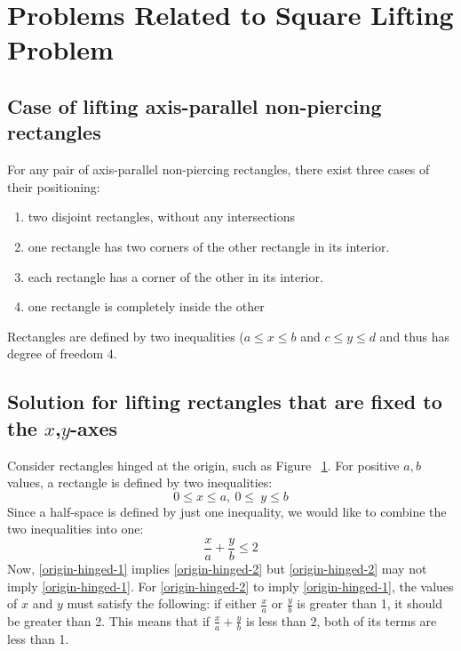 \documentclass{NSF}
\begin{document}
\section{Problems Related to Square Lifting Problem}

\subsection{Case of lifting axis-parallel non-piercing rectangles}
For any pair of axis-parallel non-piercing rectangles, there exist three cases of their positioning:
\begin{enumerate}
\item two disjoint rectangles, without any intersections
\item one rectangle has two corners of the other rectangle in its interior.
\item each rectangle has a corner of the other in its interior.
\item one rectangle is completely inside the other
\end{enumerate}
Rectangles are defined by two inequalities ($a\leq x \leq b$ and $c \leq y \leq d$ and thus has degree of freedom 4.

\begin{figure}[ht]
\hspace{.3in}
\caption{}
\label{fig:origin-building-example}
\end{figure}

\subsection{Solution for lifting rectangles that are fixed to the $x$,$y$-axes}

Consider rectangles hinged at the origin, such as Figure ~\ref{fig:origin-building-example}. For positive $a,b$ values, a rectangle is defined by two inequalities: 
\begin{equation}\label{origin-hinged-1}
0 \leq x \leq a,\  0\leq \  y \leq b
\end{equation}
Since a half-space is defined by just one inequality, we would like to combine the two inequalities into one: 
\begin{equation}\label{origin-hinged-2}
\frac{x}{a} + \frac{y}{b} \leq 2
\end{equation}
Now, \eqref{origin-hinged-1} implies \eqref{origin-hinged-2} but \eqref{origin-hinged-2}  may not imply \eqref{origin-hinged-1}. For \eqref{origin-hinged-2} to imply \eqref{origin-hinged-1}, the values of $x$ and $y$ must satisfy the following: if either $\frac{x}{a}$ or $\frac{y}{b}$ is greater than 1, it should be greater than 2. This means that if $\frac{x}{a}+\frac{y}{b}$  is less than 2, both of its terms are less than 1.
\end{document}

